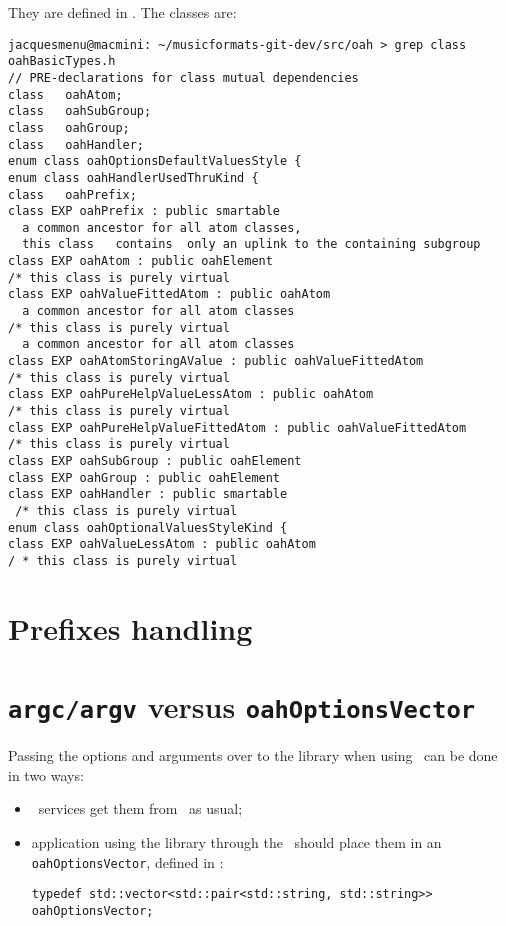 They are defined in . The classes are:
\begin{lstlisting}[language=Terminal]
jacquesmenu@macmini: ~/musicformats-git-dev/src/oah > grep class   oahBasicTypes.h
// PRE-declarations for class mutual dependencies
class   oahAtom;
class   oahSubGroup;
class   oahGroup;
class   oahHandler;
enum class oahOptionsDefaultValuesStyle {
enum class oahHandlerUsedThruKind {
class   oahPrefix;
class EXP oahPrefix : public smartable
  a common ancestor for all atom classes,
  this class   contains  only an uplink to the containing subgroup
class EXP oahAtom : public oahElement
/* this class is purely virtual
class EXP oahValueFittedAtom : public oahAtom
  a common ancestor for all atom classes
/* this class is purely virtual
  a common ancestor for all atom classes
class EXP oahAtomStoringAValue : public oahValueFittedAtom
/* this class is purely virtual
class EXP oahPureHelpValueLessAtom : public oahAtom
/* this class is purely virtual
class EXP oahPureHelpValueFittedAtom : public oahValueFittedAtom
/* this class is purely virtual
class EXP oahSubGroup : public oahElement
class EXP oahGroup : public oahElement
class EXP oahHandler : public smartable
 /* this class is purely virtual
enum class oahOptionalValuesStyleKind {
class EXP oahValueLessAtom : public oahAtom
/ * this class is purely virtual
\end{lstlisting}


\section{Prefixes handling}


\section{{\tt argc/argv} versus {\tt oahOptionsVector}}

Passing the options and arguments over to the library when using \mf\ can be done in two ways:
\begin{itemize}
\item \CLI\ services get them from \argcargv\ as usual;
\item application using the library through the \API\ should place them in an {\tt oahOptionsVector}, defined in :
\begin{lstlisting}[language=CPlusPlus]
typedef std::vector<std::pair<std::string, std::string>> oahOptionsVector;
\end{lstlisting}

\end{itemize}

